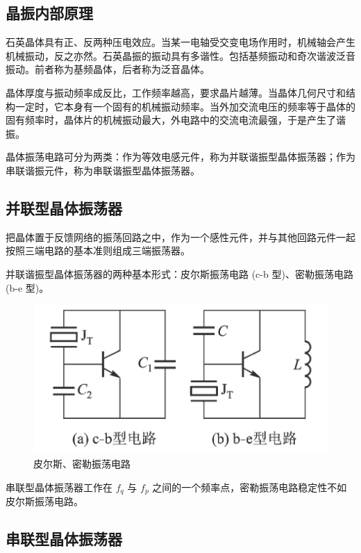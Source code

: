 \subsection{晶振内部原理}

石英晶体具有正、反两种压电效应。当某一电轴受交变电场作用时，机械轴会产生机械振动，反之亦然。石英晶振的振动具有多谐性。包括基频振动和奇次谐波泛音振动。前者称为基频晶体，后者称为泛音晶体。

晶体厚度与振动频率成反比，工作频率越高，要求晶片越薄。当晶体几何尺寸和结构一定时，它本身有一个固有的机械振动频率。当外加交流电压的频率等于晶体的固有频率时，晶体片的机械振动最大，外电路中的交流电流最强，于是产生了谐振。

晶体振荡电路可分为两类：作为等效电感元件，称为并联谐振型晶体振荡器；作为串联谐振元件，称为串联谐振型晶体振荡器。

\subsection{并联型晶体振荡器}

把晶体置于反馈网络的振荡回路之中，作为一个感性元件，并与其他回路元件一起按照三端电路的基本准则组成三端振荡器。

并联谐振型晶体振荡器的两种基本形式：皮尔斯振荡电路 (c-b 型)、密勒振荡电路 (b-e 型)。

\begin{figure}[htbp]
    \centering
    \includegraphics[scale=0.5]{image/Picture9.png}
    \caption{皮尔斯、密勒振荡电路}
\end{figure}

串联型晶体振荡器工作在 $f_q$ 与 $f_p$ 之间的一个频率点，密勒振荡电路稳定性不如皮尔斯振荡电路。

\subsection{串联型晶体振荡器}

